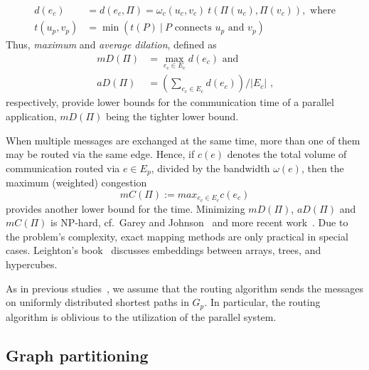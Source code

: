 \documentclass[pdftex]{llncs}
\begin{document}
\begin{align}
\label{eq:dt}
d(e_c) &= d(e_c, \Pi) = \omega_c(u_c, v_c)~t(\Pi(u_c),
\Pi(v_c)),\mbox{ where}\nonumber\\
t(u_p, v_p) &= \min(t(P)~\vert~\mbox{$P$ connects
  $u_p$ and $v_p$})
\end{align}
Thus, \emph{maximum} and \emph{average dilation}, defined as
\begin{align}
\label{eq:dil} 
mD(\Pi) &= \max_{e_c \in E_c} d(e_c) \mbox{~and}\\
aD(\Pi) &= (\sum_{e_c \in E_c} d(e_c)) / \vert E_c \vert \mbox{~,}
\end{align} 
respectively, provide lower bounds for the communication time of a
parallel application, $mD(\Pi)$ being the tighter lower bound.

When multiple messages are exchanged at the same time, more than one
of them may be routed via the same edge. Hence, if $c(e)$ denotes
the total volume of communication routed via $e \in E_p$, divided by
the bandwidth $\omega(e)$, then the maximum (weighted) congestion
\begin{equation}
\label{eq:maxCon}
mC(\Pi) := max_{e_c \in E_c} c(e_c)
\end{equation} 
provides another lower bound for the time. Minimizing $mD(\Pi)$,
$aD(\Pi)$ and $mC(\Pi)$ is NP-hard, cf.\ Garey and
Johnson~\cite{Garey:1979:CIG:578533} and more recent
work~\cite{hoefler-topomap,ManKim1991246}. Due to the problem's
complexity, exact mapping methods are only practical in special
cases. Leighton's book~\cite{Leighton92introduction} discusses
embeddings between arrays, trees, and hypercubes.

As in previous studies~\cite{hoefler-topomap}, we assume that the
routing algorithm sends the messages on uniformly distributed shortest
paths in $G_p$. In particular, the routing algorithm is oblivious to
the utilization of the parallel system. 



\subsection{Graph partitioning}
\label{sub:part_quality}
\end{document}
